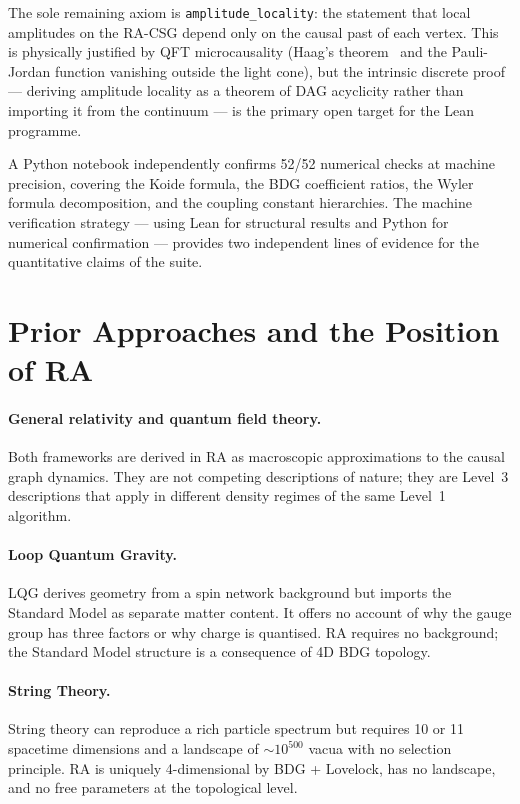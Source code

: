 \documentclass[11pt,a4paper]{article}
\begin{document}
\noindent
The sole remaining axiom is \texttt{amplitude\_locality}: the statement
that local amplitudes on the RA-CSG depend only on the causal past of
each vertex. This is physically justified by QFT microcausality (Haag's
theorem~\citep{Haag1996} and the Pauli-Jordan function vanishing outside
the light cone), but the intrinsic discrete proof --- deriving amplitude
locality as a theorem of DAG acyclicity rather than importing it from
the continuum --- is the primary open target for the Lean programme.

A Python notebook independently confirms 52/52 numerical checks at
machine precision, covering the Koide formula, the BDG coefficient
ratios, the Wyler formula decomposition, and the coupling constant
hierarchies. The machine verification strategy --- using Lean for
structural results and Python for numerical confirmation --- provides
two independent lines of evidence for the quantitative claims of the suite.

\section{Prior Approaches and the Position of RA}
\label{sec:prior}

\paragraph{General relativity and quantum field theory.}
Both frameworks are derived in RA as macroscopic approximations to the
causal graph dynamics. They are not competing descriptions of nature;
they are Level~3 descriptions that apply in different density regimes
of the same Level~1 algorithm.

\paragraph{Loop Quantum Gravity.} LQG derives geometry from a spin
network background but imports the Standard Model as separate matter
content. It offers no account of why the gauge group has three factors
or why charge is quantised. RA requires no background; the Standard
Model structure is a consequence of 4D BDG topology.

\paragraph{String Theory.} String theory can reproduce a rich particle
spectrum but requires 10 or 11 spacetime dimensions and a landscape of
$\sim 10^{500}$ vacua with no selection principle. RA is uniquely
4-dimensional by BDG + Lovelock, has no landscape, and no free
parameters at the topological level.
\end{document}

